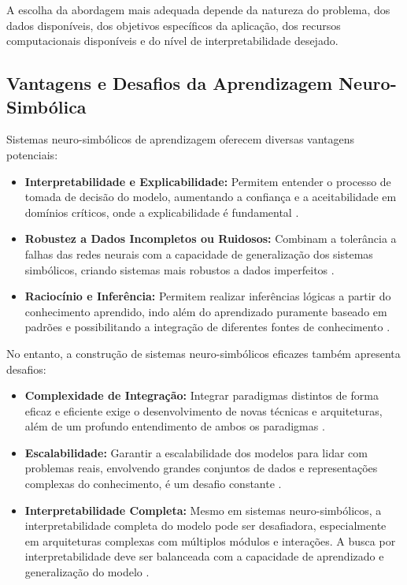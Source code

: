\documentclass[12pt]{article}
\begin{document}
A escolha da abordagem mais adequada depende da natureza do problema,  dos dados disponíveis,  dos objetivos específicos da aplicação,  dos recursos computacionais disponíveis e do nível de interpretabilidade desejado.

\subsection{Vantagens e Desafios da Aprendizagem Neuro-Simbólica}

Sistemas neuro-simbólicos de aprendizagem oferecem diversas vantagens potenciais:

\begin{itemize}
    \item \textbf{Interpretabilidade e Explicabilidade:} Permitem entender o processo de tomada de decisão do modelo,  aumentando a confiança e a aceitabilidade em domínios críticos,  onde a explicabilidade é fundamental \cite{adadi2018peeking}.
    \item \textbf{Robustez a Dados Incompletos ou Ruidosos:} Combinam a tolerância a falhas das redes neurais com a capacidade de generalização dos sistemas simbólicos,  criando sistemas mais robustos a dados imperfeitos \cite{hu2018harnessing}.
    \item \textbf{Raciocínio e Inferência:}  Permitem realizar inferências lógicas a partir do conhecimento aprendido,  indo além do aprendizado puramente baseado em padrões e possibilitando a integração de diferentes fontes de conhecimento \cite{manha2014neural}.
\end{itemize}

No entanto,  a construção de sistemas neuro-simbólicos eficazes também apresenta desafios:

\begin{itemize}
    \item \textbf{Complexidade de Integração:} Integrar paradigmas distintos de forma eficaz e eficiente exige o desenvolvimento de novas técnicas e arquiteturas,  além de um profundo entendimento de ambos os paradigmas \cite{besold2017neural}.
    \item \textbf{Escalabilidade:} Garantir a escalabilidade dos modelos para lidar com problemas reais,  envolvendo grandes conjuntos de dados e representações complexas do conhecimento,  é um desafio constante \cite{dalle2021glm}.
    \item \textbf{Interpretabilidade Completa:}  Mesmo em sistemas neuro-simbólicos,  a interpretabilidade completa do modelo pode ser desafiadora,  especialmente em arquiteturas complexas com múltiplos módulos e interações.  A busca por interpretabilidade deve ser balanceada com a capacidade de aprendizado e generalização do modelo \cite{rudin2019stop}.
\end{itemize}
\end{document}
